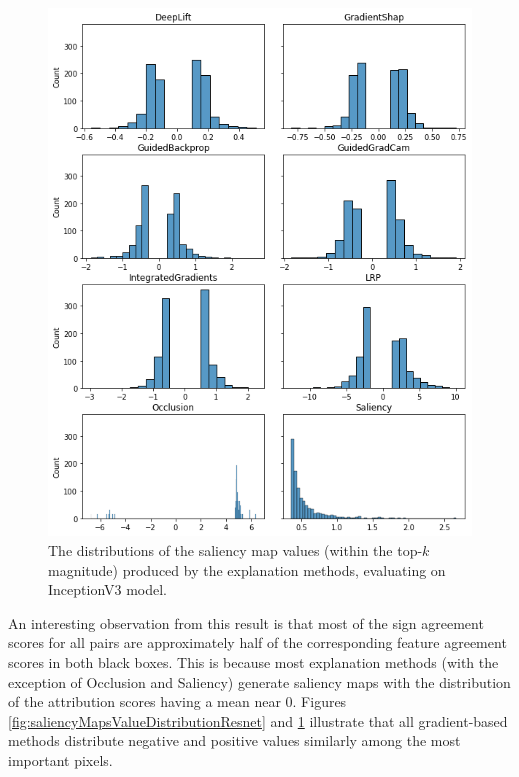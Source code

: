 \begin{figure}
    \centering
    \includegraphics[width=\textwidth]{images/results/saliency-maps-value-distribution-inceptionv3.png}
    \caption{The distributions of the saliency map values (within the top-$k$ magnitude) produced by the explanation methods, evaluating on InceptionV3 model.}
    \label{fig:saliencyMapsValueDistributionInceptionV3}
\end{figure}

An interesting observation from this result is that most of the sign agreement scores for all pairs are approximately half of the corresponding feature agreement scores in both black boxes. This is because most explanation methods (with the exception of Occlusion and Saliency) generate saliency maps with the distribution of the attribution scores having a mean near 0. Figures \ref{fig:saliencyMapsValueDistributionResnet} and \ref{fig:saliencyMapsValueDistributionInceptionV3} illustrate that all gradient-based methods distribute negative and positive values similarly among the most important pixels.

